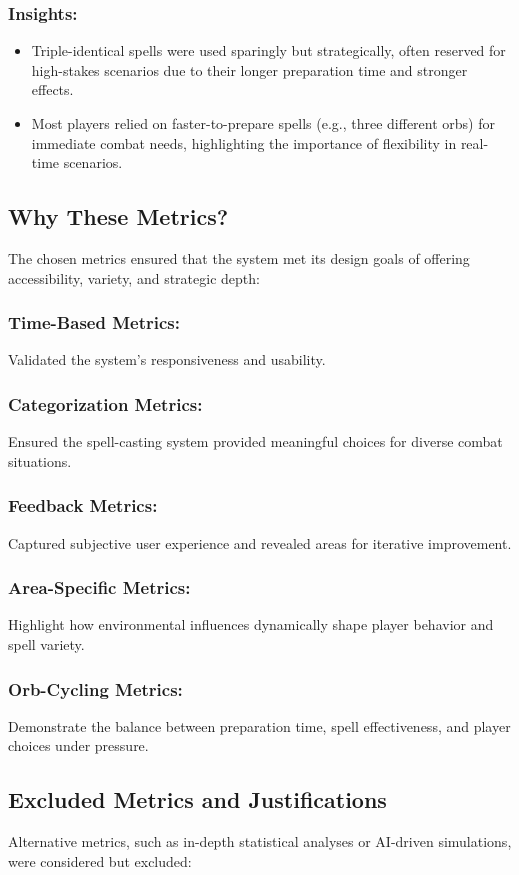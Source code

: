 \documentclass[10pt,twocolumn]{article}
\begin{document}
\subsubsection{Insights:}
\begin{itemize}
    \item Triple-identical spells were used sparingly but strategically, often reserved for high-stakes scenarios due to their longer preparation time and stronger effects.
    \item Most players relied on faster-to-prepare spells (e.g., three different orbs) for immediate combat needs, highlighting the importance of flexibility in real-time scenarios.
\end{itemize}


\subsection{Why These Metrics?}
The chosen metrics ensured that the system met its design goals of offering accessibility, variety, and strategic depth:
\subsubsection{Time-Based Metrics:}
Validated the system’s responsiveness and usability.
\subsubsection{Categorization Metrics:}
Ensured the spell-casting system provided meaningful choices for diverse combat situations.
\subsubsection{Feedback Metrics:}
Captured subjective user experience and revealed areas for iterative improvement.
\subsubsection{Area-Specific Metrics:}
Highlight how environmental influences dynamically shape player behavior and spell variety.
\subsubsection{Orb-Cycling Metrics:}
Demonstrate the balance between preparation time, spell effectiveness, and player choices under pressure.

\subsection{Excluded Metrics and Justifications}
Alternative metrics, such as in-depth statistical analyses or AI-driven simulations, were considered but excluded:
\end{document}
